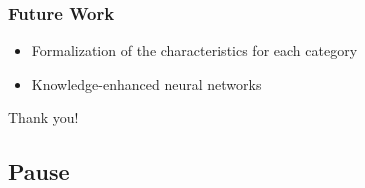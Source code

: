 \documentclass[c,8pt,xcolor...,x11names]{beamer}
\begin{document}
\begin{frame}[fragile]
 \frametitle{Future Work}
 \begin{itemize}
 	\normalsize
 	\item Formalization of the characteristics for each category
 	\item Knowledge-enhanced neural networks
\end{itemize}	
\end{frame}


\begin{frame}
	\vfill
	\begin{LARGE}
		\hfill Thank you! \hfill 
	\end{LARGE}
	\vfill
\end{frame}
\subsection{Pause}
\end{document}
